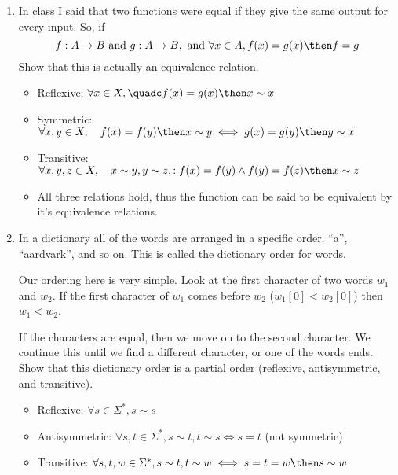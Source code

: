 \documentclass[basic, header]{nosvagor-notes}
\begin{document}
\begin{enumerate}[itemsep=5em]
  \newpage %

    \item In class I said that two functions were equal if they give the same
      output for every input. So, if
      \[f : A \to B ~\text{and}~ g : A \to B, ~\text{and}~ \forall x\in A,
      f(x) = g(x)
      \then f= g
      \]
      Show that this is actually an equivalence relation.

      \begin{itemize}
        \item Reflexive: \(\forall x \in X, \quadc f(x) = g(x) \then x \sim x\)
        \item Symmetric: \(\forall x,y \in X, \quad f(x) = f(y) \then x \sim y \iff g(x) = g(y) \then y \sim x\)
        \item Transitive: \(\forall x,y,z \in X, \quad x \sim y, y \sim z, : f(x) = f(y) \land f(y) = f(z) \then x \sim z\)
        \item All three relations hold, thus the function can be said to be equivalent by it's equivalence relations.
      \end{itemize}

    \item In a dictionary all of the words are arranged in a specific order.
      ``a'', ``aardvark'', and so on.  This is called the dictionary order for
      words.

      Our ordering here is very simple.  Look at the first character of two
      words $w_1$ and $w_2$.  If the first character of $w_1$ comes before
      $w_2$ ($w_1[0] < w_2[0]$) then $w_1 < w_2$.

      If the characters are equal, then we move on to the second character. We
      continue this until we find a different character, or one of the words
      ends. Show that this dictionary order is a partial order (reflexive,
      antisymmetric, and transitive).

      \begin{itemize}
        \item Reflexive: \(\forall  s \in \Sigma^*, s \sim s \)
        \item Antisymmetric: \(\forall s, t \in \Sigma^*, s\sim t, t \sim s \iff s = t\) (not symmetric)
        \item Transitive: \(\forall s, t, w \in \Sigma^*, s \sim t, t \sim w \iff s = t = w \then s \sim w\)
      \end{itemize}

  \end{enumerate}
\end{document}

